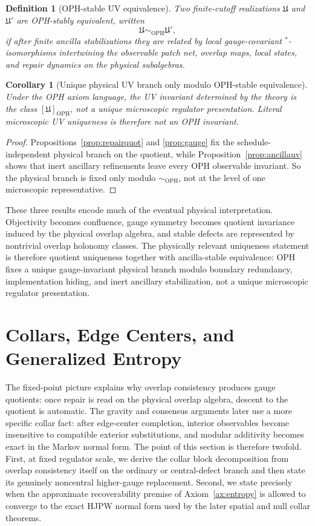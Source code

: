 \documentclass[11pt]{article}
\newtheorem{corollary}[theorem]{Corollary}
\newtheorem{definition}[theorem]{Definition}
\begin{document}
\begin{definition}[OPH-stable UV equivalence]\label{def:ophuveq}
Two finite-cutoff realizations \(\mathfrak U\) and \(\mathfrak U'\) are \emph{OPH-stably equivalent}, written
\[
\mathfrak U\sim_{\mathrm{OPH}}\mathfrak U',
\]
if after finite ancilla stabilizations they are related by local gauge-covariant \(^*\)-isomorphisms intertwining the observable patch net, overlap maps, local states, and repair dynamics on the physical subalgebras.
\end{definition}

\begin{corollary}[Unique physical UV branch only modulo OPH-stable equivalence]\label{cor:ophuveq}
Under the OPH axiom language, the UV invariant determined by the theory is the class \([\mathfrak U]_{\mathrm{OPH}}\), not a unique microscopic regulator presentation. Literal microscopic UV uniqueness is therefore not an OPH invariant.
\end{corollary}

\begin{proof}
Propositions~\ref{prop:repairquot} and \ref{prop:gauge} fix the schedule-independent physical
branch on the quotient, while Proposition~\ref{prop:ancillauv} shows that inert ancillary
refinements leave every OPH observable invariant. So the physical branch is fixed only modulo
\(\sim_{\mathrm{OPH}}\), not at the level of one microscopic representative.
\end{proof}

These three results encode much of the eventual physical interpretation. Objectivity becomes
confluence, gauge symmetry becomes quotient invariance induced by the physical overlap algebra, and
stable defects are represented by nontrivial overlap holonomy classes. The physically relevant
uniqueness statement is therefore quotient uniqueness together with ancilla-stable equivalence: OPH
fixes a unique gauge-invariant physical branch modulo boundary redundancy, implementation hiding,
and inert ancillary stabilization, not a unique microscopic regulator presentation.

\section{Collars, Edge Centers, and Generalized Entropy}

The fixed-point picture explains why overlap consistency produces gauge quotients: once repair is
read on the physical overlap algebra, descent to the quotient is automatic. The gravity and
consensus arguments later use a more specific collar fact: after edge-center completion, interior
observables become insensitive to compatible exterior substitutions, and modular additivity becomes
exact in the Markov normal form. The point of this section is therefore twofold. First, at fixed
regulator scale, we derive the collar block decomposition from overlap consistency itself on the
ordinary or central-defect branch and then state its genuinely noncentral higher-gauge replacement.
Second, we state precisely when the approximate recoverability premise of Axiom~\ref{ax:entropy} is
allowed to converge to the exact HJPW normal form used by the later spatial and null collar
theorems.
\end{document}
